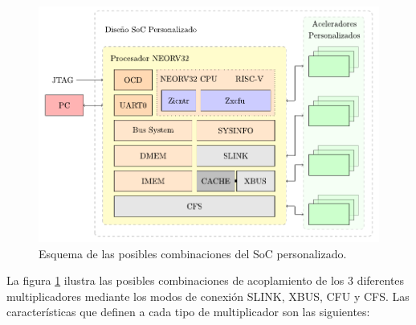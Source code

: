 \begin{figure}[h!]
    \centering
    \includegraphics[width=14cm]{Figuras/scheme.pdf}
    \caption{Esquema de las posibles combinaciones del SoC personalizado.}
    \label{fig:soc}
\end{figure}

La figura \ref{fig:soc} ilustra las posibles combinaciones de acoplamiento de los 3 diferentes multiplicadores mediante los modos de conexión SLINK, XBUS, CFU y CFS.
Las características que definen a cada tipo de multiplicador son las siguientes:

